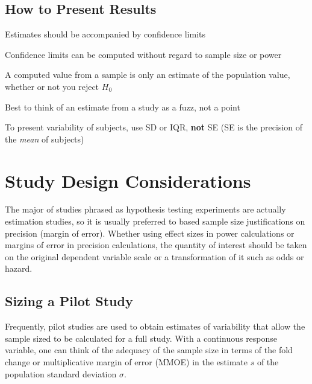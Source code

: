 \subsection{How to Present Results} 
\bi
\item Estimates should be accompanied by confidence limits
\item Confidence limits can be computed without regard to sample size
  or power
\item A computed value from a sample is only an estimate of the
  population value, whether or not you reject $H_0$
\item Best to think of an estimate from a study as a fuzz, not a point
\item To present variability of subjects, use SD or IQR, \textbf{not}
  SE (SE is the precision of the \emph{mean} of subjects)
\ei

\section{Study Design Considerations}
The major of studies phrased as hypothesis testing experiments are
actually estimation studies, so it is usually preferred to based
sample size justifications on precision (margin of error).  Whether
using effect sizes in power calculations or margins of error in
precision calculations, the quantity of interest should be taken on
the original dependent variable scale or a transformation of it such
as odds or hazard.  

\subsection{Sizing a Pilot Study}
Frequently, pilot studies are used to obtain estimates of variability
that allow the sample sized to be calculated for a full study.  With a
continuous response variable, one can think of the adequacy of the
sample size in terms of the fold change or multiplicative margin of
error (MMOE) in the estimate $s$ of the population standard deviation $\sigma$.

